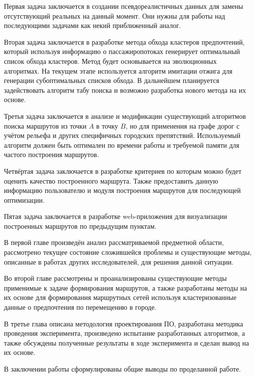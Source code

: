 Первая задача заключается в создании псевдореалистичных данных для замены отсутствующий реальных на данный 
момент. Они нужны для работы над последующими задачами как некий приближенный аналог.

Вторая задача заключается в разработке метода обхода кластеров предпочтений, который используя информацию о 
пассажиропотоках генерирует оптимальный список обхода кластеров. Метод будет основывается на эволюционных 
алгоритмах. На текущем этапе используется алгоритм имитации отжига для генерации субоптимальных списков 
обхода. В дальнейшем планируется задействовать алгоритм табу поиска и возможно разработка нового метода на 
их основе.

Третья задача заключается в анализе и модификации существующий алгоритмов поиска маршрутов из точки \( A \) 
в точку \( B \), но для применения на графе дорог с учётом рельефа и других специфичных городских 
препятствий. Используемый алгоритм должен быть оптимален по времени работы и требуемой памяти для частого 
построения маршрутов.

Четвёртая задача заключается в разработке критериев по которым можно будет оценить качество построенного 
маршрута. Также предоставить данную информацию пользователю и модуля построения маршрутов для последующей 
оптимизации.

Пятая задача заключается в разработке web-приложения для визуализации построенных маршрутов по предыдущим 
пунктам.

В первой главе произведён анализ рассматриваемой предметной области, рассмотрено текущее состояние сложившейся
проблемы и существующие методы, описанные в работах других исследователей, для решения данной ситуации. 

Во второй главе рассмотрены и проанализированы существующие методы применимые к задаче формирования 
маршрутов, а также разработаны методы на их основе для формирования маршрутных сетей используя 
кластеризованные данные о предпочтения по перемещению в городе.

В третье глава описана методология проектирования ПО, разработана методика проведения эксперимента, 
произведено испытание разработанных алгоритмов, а также обсуждены полученные результаты в ходе эксперимента 
и сделан вывод на их основе.

В заключении работы сформулированы общие выводы по проделанной работе.